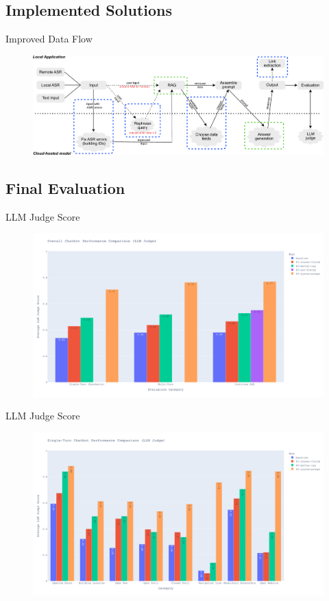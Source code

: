 \documentclass{sdqbeamer}[smallfoot]
\begin{document}
\subsection{Implemented Solutions}
\begin{frame}[t]{Improved Data Flow}
    \vspace{-0.5cm}
	\begin{figure}
	    \centering
	    \includegraphics[width=1.0\linewidth]{images/data_flow_phase_3.pdf}
	\end{figure}
\end{frame}

\subsection{Final Evaluation}
\begin{frame}[t]{LLM Judge Score}
	\vspace{-1.5cm}
	\begin{figure}
	    \centering
	    \includegraphics[width=0.75\linewidth]{images/overall_performance_comparison.png}
	\end{figure}
\end{frame}

\begin{frame}[t]{LLM Judge Score}
	\vspace{-1.5cm}
	\begin{figure}
	    \centering
	    \includegraphics[width=0.75\linewidth]{images/single_turn_performance_comparison.png}
	\end{figure}
\end{frame}
\end{document}
